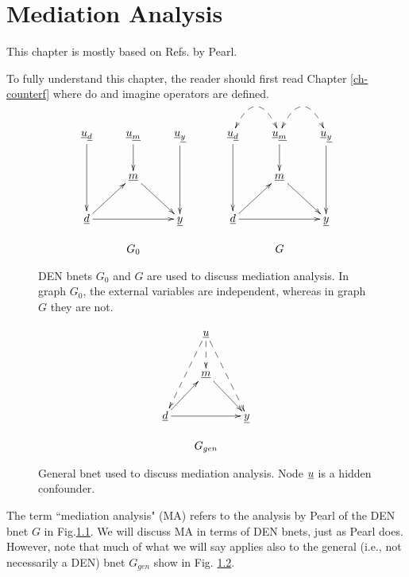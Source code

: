 \chapter{Mediation Analysis}
\label{ch-mediation}
This chapter is mostly based on 
Refs.\cite{pearl-2019review,
pearl2012-mediation} by Pearl.

To fully
understand this chapter,
the reader should first read Chapter \ref{ch-counterf}
where do and imagine operators are defined.


\begin{figure}[h!]
$$
\begin{array}{ccc}
\\
\xymatrix{
\rvu_\rvd\ar[dd]
&\rvu_\rvm\ar[d]
&\rvu_\rvy\ar[dd]
\\
&\rvm\ar[rd]
\\
\rvd\ar[ru]\ar[rr]&&\rvy
}
&\;\;\;\;&
\xymatrix{
\rvu_\rvd\ar[dd]\ar@/^2pc/@{<-->}[r]
&\rvu_\rvm\ar[d]\ar@/^2pc/@{<-->}[r]
&\rvu_\rvy\ar[dd]
\\
&\rvm\ar[rd]
\\
\rvd\ar[ru]\ar[rr]&&\rvy
}
\\
\\
G_0&&G
\end{array}
$$
\caption{DEN bnets $G_0$ and $G$
are used to 
discuss mediation analysis.
In graph
$G_0$,
the external
variables are independent,
whereas in graph $G$
they are not.}
\label{fig-mediation-bnets}
\end{figure}

\begin{figure}[h!]
$$
\begin{array}{c}
\xymatrix{
&\rvu
\ar@{-->}[d]
\ar@{-->}[ldd]
\ar@{-->}[rdd]
\\
&\rvm\ar[rd]
\\
\rvd\ar[ru]\ar[rr]&&\rvy
}
\\
\\
G_{gen}
\end{array}
$$
\caption{General bnet used to 
discuss mediation analysis.
Node ${\underline{u}}$ is a hidden confounder.}
\label{fig-gen-bnet-mediation}
\end{figure}

The term ``mediation analysis" (MA)
refers
to  the analysis by Pearl
of the DEN bnet
$G$
in Fig.\ref{fig-mediation-bnets}.
We will discuss MA in terms
of DEN bnets, just as Pearl does.
However, note that much of 
what we will say applies also to 
the general (i.e., not
necessarily a DEN) bnet $G_{gen}$
show in Fig. \ref{fig-gen-bnet-mediation}.



